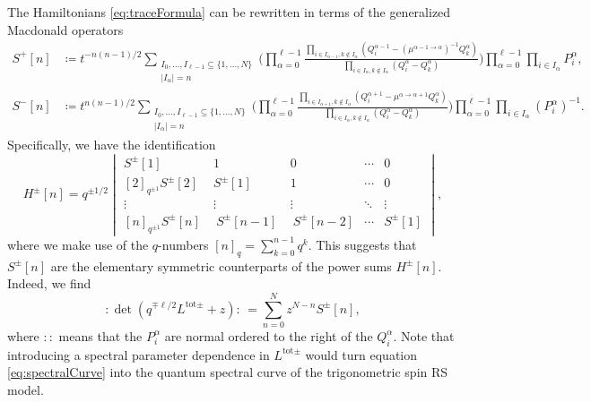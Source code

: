 The Hamiltonians \eqref{eq:traceFormula} can be rewritten in terms of the generalized Macdonald operators
\begin{equation}\label{eq:macdonald}
    \begin{aligned}
    S^+[n] &\coloneq t^{-n(n-1)/2} \!\!\!\!\!\!\!\!\!\! \sum_{\substack{I_0,\dots,I_{\ell-1} \subseteq \{ 1,\dots,N \} \\ |I_\alpha|=n}} \Bigg( \prod_{\alpha=0}^{\ell-1} \frac{\prod_{i \in I_{\alpha-1},k \notin I_\alpha} (Q_i^{\alpha-1}-(\mu^{\alpha-1\to\alpha})^{-1} Q_k^\alpha)}{\prod_{i \in I_{\alpha},k \notin I_\alpha} (Q_i^\alpha-Q_k^\alpha)} \Bigg) \prod_{\alpha=0}^{\ell-1} \prod_{i \in I_\alpha} P_i^\alpha, \\
    S^-[n] &\coloneq t^{n(n-1)/2} \!\!\!\!\!\! \sum_{\substack{I_0,\dots,I_{\ell-1} \subseteq \{ 1,\dots,N \} \\ |I_\alpha|=n}} \Bigg( \prod_{\alpha=0}^{\ell-1} \frac{\prod_{i \in I_{\alpha+1},k \notin I_\alpha} (Q_i^{\alpha+1}-\mu^{\alpha\to\alpha+1} Q_k^\alpha)}{\prod_{i \in I_{\alpha},k \notin I_\alpha} (Q_i^\alpha-Q_k^\alpha)} \Bigg) \prod_{\alpha=0}^{\ell-1} \prod_{i \in I_\alpha} (P_i^\alpha)^{-1}.
    \end{aligned}
\end{equation}
Specifically, we have the identification
\begin{equation}\label{eq:determinant}
    H^\pm[n] = q^{\pm 1/2}
    \begin{vmatrix}
        S^\pm[1] & 1 & 0 & \cdots & 0 \\
        [2]_{q^{\pm 1}} S^\pm[2] & S^\pm[1] & 1 & \cdots & 0 \\
        \vdots & \vdots & \vdots & \ddots & \vdots \\
        [n]_{q^{\pm 1}} S^\pm[n] ~&~ S^\pm[n-1] ~&~ S^\pm[n-2] & \cdots & S^\pm[1]
    \end{vmatrix},
\end{equation}
where we make use of the $q$-numbers $[n]_q = \sum_{k=0}^{n-1} q^k$. This suggests that $S^\pm[n]$ are the elementary symmetric counterparts of the power sums $H^\pm[n]$. Indeed, we find
\begin{equation}\label{eq:spectralCurve}
    : {\det(q^{\mp\ell/2} L^{\text{tot}\pm}+z)} : \, = \sum_{n=0}^N z^{N-n} S^\pm[n],
\end{equation}
where $::$ means that the $P_i^\alpha$ are normal ordered to the right of the $Q_i^\alpha$. Note that introducing a spectral parameter dependence in $L^{\text{tot}\pm}$ would turn equation \eqref{eq:spectralCurve} into the quantum spectral curve of the trigonometric spin RS model.

